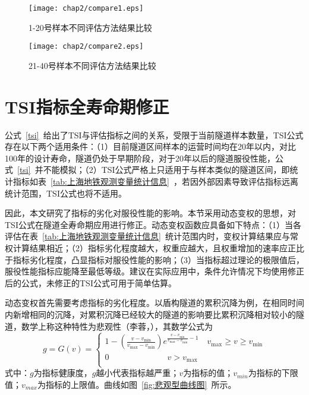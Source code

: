 \begin{figure}[htbp]
    \centering
    \texttt{[image: chap2/compare1.eps]}
    \caption{1-20号样本不同评估方法结果比较}
    \label{fig:1-20号样本不同评估方法结果比较}
\end{figure}

\begin{figure}[htbp]
    \centering
    \texttt{[image: chap2/compare2.eps]}
    \caption{21-40号样本不同评估方法结果比较}
    \label{fig:21-40号样本不同评估方法结果比较}
\end{figure}

\section{TSI指标全寿命期修正}

公式~\ref{tsi}~给出了TSI与评估指标之间的关系，受限于当前隧道样本数量，TSI公式存在以下两个适用条件：（1）目前隧道区间样本的运营时间均在20年以内，对比100年的设计寿命，隧道仍处于早期阶段，对于20年以后的隧道服役性能，公式~\ref{tsi}~并不能模拟；（2）TSI公式严格上只适用于与样本类似的隧道区间，即统计指标如表~\ref{tab:上海地铁观测变量统计信息}~，若因外部因素导致评估指标远离统计范围，TSI公式也将不适用。

因此，本文研究了指标的劣化对服役性能的影响。本节采用动态变权的思想，对TSI公式在隧道全寿命期应用进行修正。动态变权函数应具备如下特点：（1）当各评估在表~\ref{tab:上海地铁观测变量统计信息}~统计范围内时，变权计算结果应与常权计算结果相近；（2）指标劣化程度越大，权重应越大，且权重增加的速率应正比于指标劣化程度，凸显指标对服役性能的影响；（3）当指标超过理论的极限值后，服役性能指标应能降至最低等级。建议在实际应用中，条件允许情况下均使用修正后的公式，未修正的TSI公式可用于简单估算。

动态变权首先需要考虑指标的劣化程度。以盾构隧道的累积沉降为例，在相同时间内新增相同的沉降，对累积沉降已经较大的隧道的影响要比累积沉降相对较小的隧道，数学上称这种特性为悲观性（李蓉，\citeyear{李蓉2007基于层次分析法的桥梁健康状态模糊综合评估方法的研究及其应用}），其数学公式为
\begin{equation}
    g=G(v)=\left\{ \begin{matrix}
   1-\left( \frac{v-{{v}_{\min }}}{{{v}_{\max }}-{{v}_{\min }}} \right){{e}^{\frac{v-{{v}_{\min }}}{{{v}_{\max }}-{{v}_{\min }}}-1}}\quad {{v}_{\max }}\ge v\ge {{v}_{\min }}  \\
   0\quad \quad \quad \quad \quad \quad \quad v>{{v}_{\max }}  \\
\end{matrix} \right.
\end{equation}
式中：$g$为指标健康度，$g$越小代表指标越严重；$v$为指标的值；$v_{min}$为指标的下限值；$v_{max}$为指标的上限值。曲线如图~\ref{fig:悲观型曲线图}~所示。

